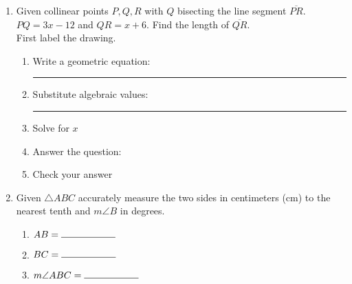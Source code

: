 \documentclass[12pt, oneside]{article}
\begin{document}
\begin{enumerate}
\item Given collinear points $P, Q, R$ with $Q$ bisecting the line segment $\overline{PR}$. $PQ=3x -12$ and $QR = x+6$. Find the length of $\overline{QR}$.\\First label the drawing.
  \begin{flushright}
  \end{flushright}
  \begin{enumerate}
    \item Write a geometric equation: \rule{4cm}{0.15mm} \vspace{.7cm}
    \item Substitute algebraic values: \rule{4cm}{0.15mm}
    \item Solve for $x$
    \vspace{2.5cm}
    \item Answer the question: \bigskip
    \item Check your answer
  \end{enumerate}

\newpage
  \item Given $\triangle ABC$ accurately measure the two sides in centimeters (cm) to the nearest tenth and $m \angle B$ in degrees.
    \bigskip
  \begin{enumerate}
    \item $AB= \rule{2cm}{0.15mm}$ \bigskip
    \item $BC= \rule{2cm}{0.15mm}$ \bigskip
    \item $m \angle ABC= \rule{2cm}{0.15mm}$
  \end{enumerate}
  \begin{center}
  \end{center}



\end{enumerate}
\end{document}
